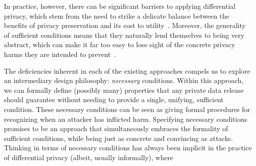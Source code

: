 In practice, however, there can be significant barriers to applying differential privacy, which stem from the need to strike a delicate balance between the benefits of privacy preservation and its cost to utility~\cite{amin2024practicalconsiderationsdifferentialprivacy}. Moreover, the generality of sufficient conditions means that they naturally lend themselves to being very abstract, which can make it far too easy to lose sight of the concrete privacy harms they are intended to prevent~\cite{CummingsHSS24}. 

The deficiencies inherent in each of the existing approaches compels us to explore an intermediary design philosophy:  \emph{necessary} conditions.  Within this approach, we can formally define (possibly many) properties that any private data release should guarantee without needing to provide a single, unifying, sufficient condition.  These necessary conditions can be seen as giving formal procedures for recognizing when an attacker has inflicted harm. Specifying necessary conditions promises to be an approach that simultaneously embraces the formality of sufficient conditions, while being just as concrete and convincing as attacks. Thinking in terms of necessary conditions has always been implicit in the practice of differential privacy (albeit, usually informally), where  

